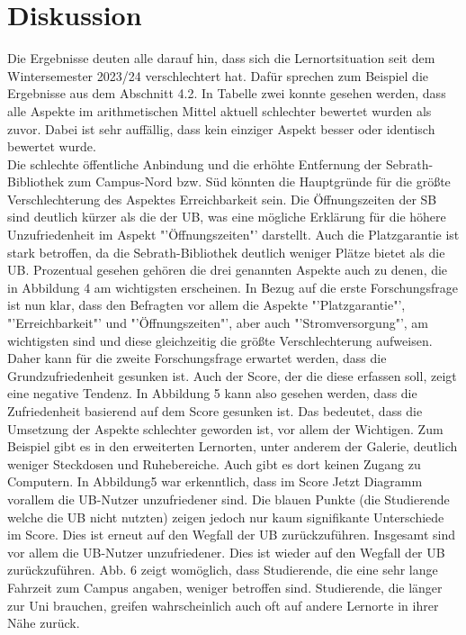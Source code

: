 \documentclass[11pt, a4paper]{article}
\begin{document}
\section{Diskussion}
Die Ergebnisse deuten alle darauf hin, dass sich die Lernortsituation seit dem Wintersemester  2023/24 verschlechtert hat. Dafür sprechen zum Beispiel die Ergebnisse aus dem Abschnitt 4.2. In Tabelle zwei konnte gesehen werden, dass alle Aspekte im arithmetischen Mittel aktuell schlechter bewertet wurden als zuvor. Dabei ist sehr auffällig, dass kein einziger Aspekt besser oder identisch bewertet wurde.\\
Die schlechte öffentliche Anbindung und die erhöhte Entfernung der Sebrath-Bibliothek zum Campus-Nord bzw. Süd könnten die Hauptgründe für die größte Verschlechterung des Aspektes Erreichbarkeit sein. Die Öffnungszeiten der SB sind deutlich kürzer als die der UB, was eine mögliche Erklärung für die höhere Unzufriedenheit im Aspekt "'Öffnungszeiten"' darstellt.
Auch die Platzgarantie ist stark betroffen, da die Sebrath-Bibliothek deutlich weniger Plätze bietet als die UB. 
Prozentual gesehen gehören die drei genannten Aspekte auch zu denen, die in Abbildung 4 am wichtigsten erscheinen. In Bezug auf die erste Forschungsfrage ist nun klar, dass den Befragten vor allem die Aspekte "'Platzgarantie"', "'Erreichbarkeit"' und "'Öffnungszeiten"', aber auch "'Stromversorgung"', am wichtigsten sind und diese gleichzeitig die größte Verschlechterung aufweisen. Daher kann für die zweite Forschungsfrage erwartet werden, dass die Grundzufriedenheit gesunken ist.
Auch der Score, der die diese erfassen soll, zeigt eine negative Tendenz. In Abbildung 5 kann also gesehen werden, dass die Zufriedenheit basierend auf dem Score gesunken ist.
Das bedeutet, dass die Umsetzung der Aspekte schlechter geworden ist, vor allem der Wichtigen. Zum Beispiel gibt es in den erweiterten Lernorten, unter anderem der Galerie, deutlich weniger Steckdosen und Ruhebereiche. Auch gibt es dort keinen Zugang zu Computern. In Abbildung5 war erkenntlich, dass im Score Jetzt Diagramm vorallem die UB-Nutzer unzufriedener sind. Die blauen Punkte (die Studierende welche die UB nicht nutzten) zeigen jedoch nur kaum signifikante Unterschiede im Score. Dies ist erneut auf den Wegfall der UB zurückzuführen. Insgesamt sind vor allem die UB-Nutzer unzufriedener. Dies ist wieder auf den Wegfall der UB zurückzuführen. Abb. 6 zeigt womöglich, dass Studierende, die eine sehr lange Fahrzeit zum Campus angaben, weniger betroffen sind. Studierende, die länger zur Uni brauchen, greifen wahrscheinlich auch oft auf andere Lernorte in ihrer Nähe zurück. \\
\end{document}
